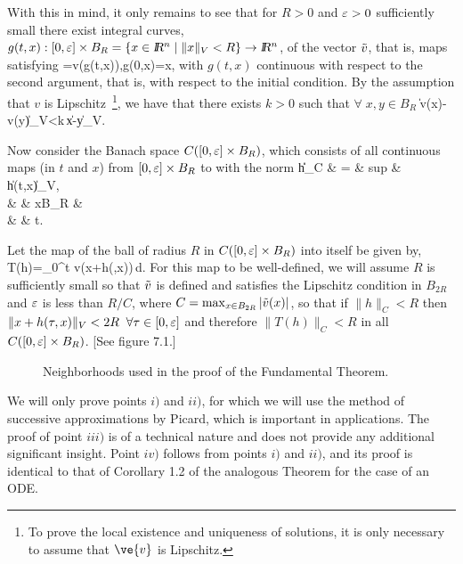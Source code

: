 With this in mind, it only remains to see that for $R>0$ and $\mbox{$\varepsilon$}>0$
sufficiently small 
there exist integral curves, 
$g(t,x):[0,\eps] \times B_R=\{x\in \ren
\;|\;\|x\|_V < R  \} \to \ren$,  
of the vector $\tilde v$, that is, maps satisfying
\beq  
{}=\ti v(g(t,x))\;\;\;,\;\;\;\;\;g(0,x)=x,
\label{7*}\eeq
with $g(t,x)$ continuous with respect to the second argument, that is, with
respect to the initial condition. By the assumption that $v$
is Lipschitz~\footnote{To prove the local existence and uniqueness of solutions, it is only 
necessary to assume that $\ve{v}$ is Lipschitz.}, 
we have that there exists $k>0$ such that $\forall\;x,y\in B_R$
\beq
\|\ti v(x)-\ti v(y)\|_V<k\,\|x-y\|_V\;.\eeq

Now consider the Banach space $C([0,\mbox{$\varepsilon$}]\times B_R)$, which consists
of all continuous maps (in $t$ and $x$) from $[0,\mbox{$\varepsilon$}]\times B_R$
to \ren{} with the norm 
\beq{}
     \|h\|_C & = & sup & \|h(t,x)\|_V\;\;, \\
             &   & x\in B_R & \\
             &   & t\in[0,\eps].
             \earr
\eeq

Let the map of the ball of radius $R$ in $C([0,\mbox{$\varepsilon$} ]\times B_R)$ into itself be given by,
\beq
T(h)=\int_0^t \ti v(x+h(\tau,x))\,d\tau\;\;.
\eeq
For this map to be well-defined, we will assume $R$ is
sufficiently small so that $\tilde v$ is defined and
satisfies the Lipschitz condition in $B_{2R}$ and $\mbox{$\varepsilon$}$ is less than
$R/C$, where \hfill 
$C=\max_{x\in B_{2R}} |\tilde v(x)|$, so that 
if $\|h\|_C < R$ then $\|x+h(\tau,x)\|_V < 2R \;\;\forall \tau\in[0,\mbox{$\varepsilon$}]$
and therefore
$\|T(h)\|_C < R$ in all $C([0,\mbox{$\varepsilon$} ]\times B_R)$. [See figure 7.1.] 

\espa 

\begin{figure}[htbp]
  \begin{center}
    \caption{Neighborhoods used in the proof of the Fundamental Theorem.}
    \label{fig:7_1}
   \end{center}
\end{figure}

We will only prove points $i)$ and $ii)$, for which we will use the
method of successive approximations by Picard, which is important in applications. The proof of point $iii)$ is of a technical nature and does not provide any additional significant insight. Point $iv)$ follows from points $i)$ and $ii)$, and its proof is identical to that of Corollary 1.2 of the analogous Theorem for the case of an ODE.

